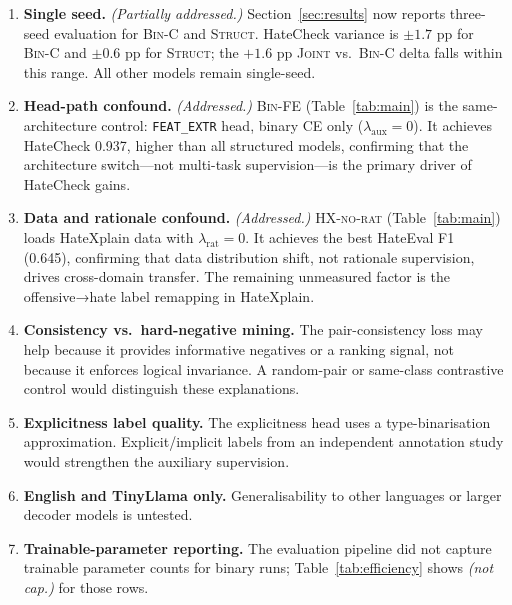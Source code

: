 \documentclass{article}
\begin{document}
\begin{enumerate}
  \item \textbf{Single seed.} \emph{(Partially addressed.)}
    Section~\ref{sec:results} now reports three-seed evaluation for
    \textsc{Bin-C} and \textsc{Struct}.
    HateCheck variance is $\pm 1.7$ pp for \textsc{Bin-C} and $\pm 0.6$ pp
    for \textsc{Struct}; the $+1.6$ pp \textsc{Joint} vs.\ \textsc{Bin-C} delta
    falls within this range.
    All other models remain single-seed.

  \item \textbf{Head-path confound.} \emph{(Addressed.)}
    \textsc{Bin-FE} (Table~\ref{tab:main}) is the same-architecture control:
    \texttt{FEAT\_EXTR} head, binary CE only ($\lambda_\text{aux}=0$).
    It achieves HateCheck 0.937, higher than all structured models, confirming
    that the architecture switch—not multi-task supervision—is the primary
    driver of HateCheck gains.

  \item \textbf{Data and rationale confound.} \emph{(Addressed.)}
    \textsc{HX-no-rat} (Table~\ref{tab:main}) loads HateXplain data with
    $\lambda_\text{rat}=0$.
    It achieves the best HateEval F1 (0.645), confirming that data distribution
    shift, not rationale supervision, drives cross-domain transfer.
    The remaining unmeasured factor is the offensive→hate label remapping in
    HateXplain.

  \item \textbf{Consistency vs.\ hard-negative mining.}
    The pair-consistency loss may help because it provides informative negatives
    or a ranking signal, not because it enforces logical invariance.
    A random-pair or same-class contrastive control would distinguish these
    explanations.

  \item \textbf{Explicitness label quality.}
    The explicitness head uses a type-binarisation approximation.
    Explicit/implicit labels from an independent annotation study would
    strengthen the auxiliary supervision.

  \item \textbf{English and TinyLlama only.}
    Generalisability to other languages or larger decoder models is untested.

  \item \textbf{Trainable-parameter reporting.}
    The evaluation pipeline did not capture trainable parameter counts for binary
    runs; Table~\ref{tab:efficiency} shows \emph{(not cap.)} for those rows.

\end{enumerate}
\end{document}
